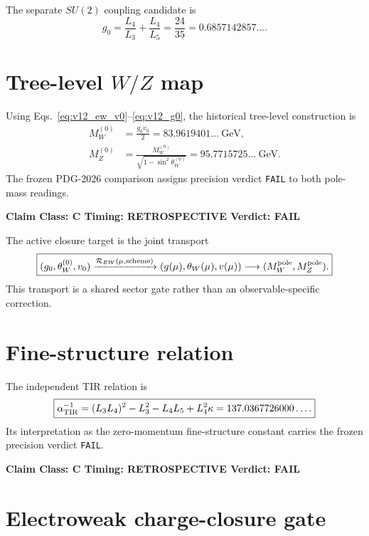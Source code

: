 \documentclass[11pt,a4paper,twoside]{book}
\theoremstyle{definition}
\newcommand{\vTwelveStatus}[3]{\par\noindent\textbf{Claim Class: #1 \quad Timing: #2 \quad Verdict: #3}\par}
\begin{document}
The separate $SU(2)$ coupling candidate is
\begin{equation}
\boxed{
g_0=\frac{L_4}{L_3}+\frac{L_4}{L_5}
=\frac{24}{35}
=0.6857142857\ldots .
}
\label{eq:v12_g0}
\end{equation}

\section[Tree-level W/Z map]{Tree-level $W/Z$ map}

Using Eqs.~\eqref{eq:v12_ew_v0}--\eqref{eq:v12_g0}, the historical tree-level construction is
\begin{align}
M_W^{(0)}&=\frac{g_0v_0}{2}
=83.9619401\ldots\ \mathrm{GeV},\\
M_Z^{(0)}&=\frac{M_W^{(0)}}{\sqrt{1-\sin^2\theta_W^{(0)}}}
=95.7715725\ldots\ \mathrm{GeV}.
\end{align}
The frozen PDG-2026 comparison assigns precision verdict \texttt{FAIL} to both pole-mass readings.
\vTwelveStatus{C}{RETROSPECTIVE}{FAIL}

The active closure target is the joint transport
\begin{equation}
\boxed{
(g_0,\theta_W^{(0)},v_0)
\xrightarrow{\mathcal R_{EW}(\mu,\mathrm{scheme})}
(g(\mu),\theta_W(\mu),v(\mu))
\longrightarrow
(M_W^{\rm pole},M_Z^{\rm pole}).
}
\label{eq:v12_rew}
\end{equation}
This transport is a shared sector gate rather than an observable-specific correction.

\section{Fine-structure relation}

The independent TIR relation is
\begin{equation}
\boxed{
\alpha_{\rm TIR}^{-1}
=(L_3L_4)^2-L_3^2-L_4L_5+L_4^2\kappa
=137.0367726000\ldots .
}
\label{eq:v12_alpha_inv}
\end{equation}
Its interpretation as the zero-momentum fine-structure constant carries the frozen precision verdict \texttt{FAIL}.
\vTwelveStatus{C}{RETROSPECTIVE}{FAIL}

\section{Electroweak charge-closure gate}
\end{document}
